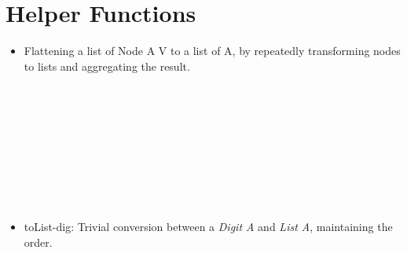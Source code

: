 \documentclass[12pt,twoside,notitlepage]{report}
\begin{document}
\section{Helper Functions}
\label{app:helper}
\begin{itemize}

\item Flattening a list of Node A V to a list of A, by repeatedly transforming nodes to lists and aggregating the result.

\begin{code}
\\
\> \AgdaSymbol{:}  \AgdaSymbol{\{}\AgdaSymbol{\}\{} \AgdaSymbol{:}  \AgdaSymbol{\}\{} \AgdaSymbol{:}   \AgdaSymbol{\}}\<%
\\
\>[6]\<[14]%
\>[14]  \AgdaSymbol{:}   \<%
\\
\>[6]\<[14]%
\>[14]  \AgdaSymbol{:}    \<%
\\
\>[6]\<[14]%
\>[14]  \AgdaSymbol{(}  \AgdaSymbol{)}\<%
\\
\>[6]\<[14]%
\>[14]  \<%
\\
\> \AgdaInductiveConstructor{[]} \AgdaSymbol{=} \AgdaInductiveConstructor{[]}\<%
\\
\> \AgdaSymbol{(}  \AgdaSymbol{)} \AgdaSymbol{=} \AgdaSymbol{(} \AgdaSymbol{)} \AgdaFunction{++} \AgdaSymbol{(} \AgdaSymbol{)}\<%
\\
\end{code}

\item toList-dig: Trivial conversion between a \textit{Digit A} and \textit{List A}, maintaining the order.


\end{itemize}
\end{document}
